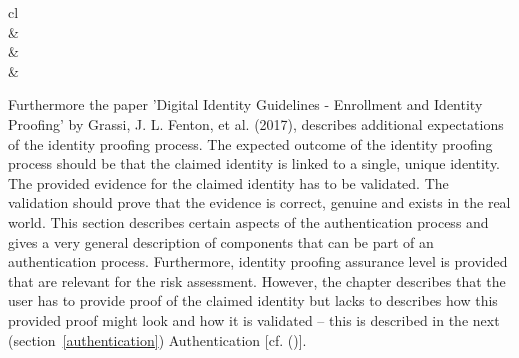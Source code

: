 \begin{table}[h]
	\centering
	\begingroup
	\setlength{\tabcolsep}{10pt} %
	\renewcommand{\arraystretch}{1.5} %
	\begin{tabular}{cl}
		\hline
		                                                                                                                                                                   \\ \hline
		 &    \\ \hline
		 &  \\ \hline
		 &                                             \\ \hline
	\end{tabular}
	\endgroup
	\caption{Identity Assurance Levels (\cite{NIST:2017:DIG}, p.18)} \label{tab:ial}
\end{table}

Furthermore the paper 'Digital Identity Guidelines - Enrollment and Identity Proofing' by Grassi, J. L. Fenton, et al. (2017), describes additional expectations of the identity proofing process. The expected outcome of the identity proofing process should be that the claimed identity is linked to a single, unique identity. The provided evidence for the claimed identity has to be validated. The validation should prove that the evidence is correct, genuine and exists in the real world.
This section describes certain aspects of the authentication process and gives a very general description of components that can be part of an authentication process. Furthermore, identity proofing assurance level is provided that are relevant for the risk assessment. However, the chapter describes that the user has to provide proof of the claimed identity but lacks to describes how this provided proof might look and how it is validated – this is described in the next (section~\ref{authentication}) Authentication [cf. (\cite{NIST:2017:DIGEIP})].
	

